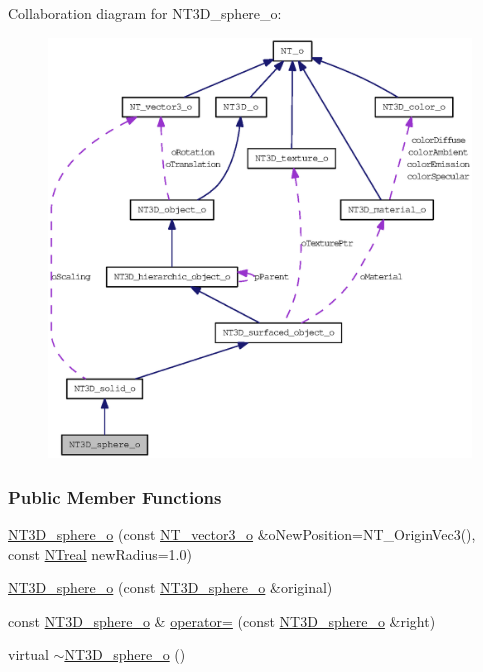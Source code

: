 Collaboration diagram for NT3D\_\-sphere\_\-o:
\nopagebreak
\begin{figure}[H]
\begin{center}
\leavevmode
\includegraphics[width=400pt]{class_n_t3_d__sphere__o__coll__graph}
\end{center}
\end{figure}
\subsubsection*{Public Member Functions}
\begin{DoxyCompactItemize}
\item 
\hyperlink{class_n_t3_d__sphere__o_a3f2ce211aad2961454c9f1947d7781ec}{NT3D\_\-sphere\_\-o} (const \hyperlink{class_n_t__vector3__o}{NT\_\-vector3\_\-o} \&oNewPosition=NT\_\-OriginVec3(), const \hyperlink{nt__types_8h_a814a97893e9deb1eedcc7604529ba80d}{NTreal} newRadius=1.0)
\item 
\hyperlink{class_n_t3_d__sphere__o_a20f5b7dbcbd46c14bbbb0d39ff9af473}{NT3D\_\-sphere\_\-o} (const \hyperlink{class_n_t3_d__sphere__o}{NT3D\_\-sphere\_\-o} \&original)
\item 
const \hyperlink{class_n_t3_d__sphere__o}{NT3D\_\-sphere\_\-o} \& \hyperlink{class_n_t3_d__sphere__o_a85c98acc58771426764b57a864b3659c}{operator=} (const \hyperlink{class_n_t3_d__sphere__o}{NT3D\_\-sphere\_\-o} \&right)
\item 
virtual \hyperlink{class_n_t3_d__sphere__o_aecf5e6474d1c38a490ec56241c3307be}{$\sim$NT3D\_\-sphere\_\-o} ()
\end{DoxyCompactItemize}

